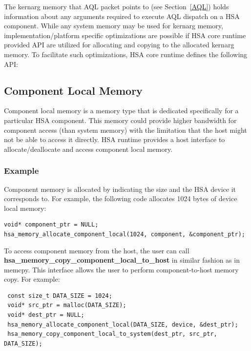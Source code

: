 \documentclass[draft]{book}
\newcommand{\reffun}[1]{\textbf{#1}}
\begin{document}
The kernarg memory that AQL packet points to (see Section~\ref{AQL}) holds
information about any arguments required to execute AQL dispatch on a HSA
component. While any system memory may be used for kernarg memory,
implementation/platform specific optimizations are possible if HSA core runtime
provided API are utilized for allocating and copying to the allocated kernarg
memory. To facilitate such optimizations, HSA core runtime defines the following
API:



\hypertarget{device-memory}{}\subsection{Component Local Memory}
\label{device-memory}

Component local memory is a memory type that is dedicated specifically for a
particular HSA component. This memory could provide higher bandwidth for
component access (than system memory) with the limitation that the host might
not be able to access it directly. HSA runtime provides a host interface to
allocate/deallocate and access component local memory.



\hypertarget{device-memory-usage}{}\subsubsection{Example}\label{device-memory-usage}

Component memory is allocated by indicating the size and the HSA device it
corresponds to. For example, the following code allocates 1024 bytes of device
local memory:

\begin{lstlisting}
void* component_ptr = NULL;
hsa_memory_allocate_component_local(1024, component, &component_ptr);
\end{lstlisting}

To access component memory from the host, the user can call
\reffun{hsa_memory_copy_component_local_to_host} in similar fashion as in
memcpy. This interface allows the user to perform component-\/to-\/host memory
copy. For example:

\begin{lstlisting}
 const size_t DATA_SIZE = 1024;
 void* src_ptr = malloc(DATA_SIZE);
 void* dest_ptr = NULL;
 hsa_memory_allocate_component_local(DATA_SIZE, device, &dest_ptr);
 hsa_memory_copy_component_local_to_system(dest_ptr, src_ptr, DATA_SIZE);
\end{lstlisting}
\end{document}
